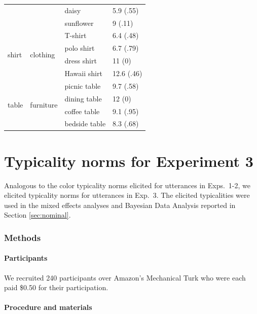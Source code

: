 \documentclass[11pt]{article}
\newcommand{\sectionref}[1]{Section \ref{#1}}
\begin{document}
\begin{table}
\begin{tabular}{l l l l}
		& & daisy & 5.9 (.55)\\
		& & sunflower & 9 (.11)\\
	\midrule
	\multirow{4}{*}{shirt} & \multirow{4}{*}{clothing} & T-shirt & 6.4 (.48)\\
		& & polo shirt & 6.7 (.79)\\
		& & dress shirt & 11 (0)\\
		& & Hawaii shirt & 12.6 (.46)\\
	\midrule
	\multirow{4}{*}{table} & \multirow{4}{*}{furniture} & picnic table & 9.7 (.58)\\
		& & dining table & 12 (0)\\
		& & coffee table & 9.1 (.95)\\
		& & bedside table & 8.3 (.68)\\				
	\bottomrule
	\end{tabular}
\end{table}


\section{Typicality norms for Experiment 3}
\label{app:typicalitynorms2}

Analogous to the color typicality norms elicited for utterances in Exps.~1-2, we elicited typicality norms for utterances in Exp.~3. The elicited typicalities were used in the mixed effects analyses and Bayesian Data Analysis reported in \sectionref{sec:nominal}.

\subsubsection{Methods}

\paragraph{Participants}

We recruited 240 participants over Amazon's Mechanical Turk who were each paid \$0.50 for their participation.

\paragraph{Procedure and materials}
\end{document}
